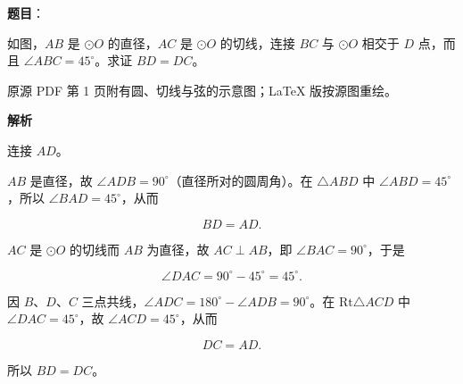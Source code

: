 \begin{answer}

\textbf{题目}：

如图，$AB$ 是 $\odot O$ 的直径，$AC$ 是 $\odot O$ 的切线，连接 $BC$ 与 $\odot O$ 相交于 $D$ 点，而且 $\angle ABC=45^\circ$。求证 $BD=DC$。

\begin{gktip}
原源 PDF 第 1 页附有圆、切线与弦的示意图；LaTeX 版按源图重绘。
\end{gktip}
\nopagebreak[4]
\begin{center}\end{center}
\nopagebreak[4]
\textbf{解析}

连接 $AD$。

$AB$ 是直径，故 $\angle ADB=90^\circ$（直径所对的圆周角）。在 $\triangle ABD$ 中 $\angle ABD=45^\circ$，所以 $\angle BAD=45^\circ$，从而

\nopagebreak[4]
\[
BD=AD.
\]

$AC$ 是 $\odot O$ 的切线而 $AB$ 为直径，故 $AC\perp AB$，即 $\angle BAC=90^\circ$，于是

\nopagebreak[4]
\[
\angle DAC=90^\circ-45^\circ=45^\circ.
\]

因 $B\text{、}D\text{、}C$ 三点共线，$\angle ADC=180^\circ-\angle ADB=90^\circ$。在 $\mathrm{Rt}\triangle ACD$ 中 $\angle DAC=45^\circ$，故 $\angle ACD=45^\circ$，从而

\nopagebreak[4]
\[
DC=AD.
\]

所以 $BD=DC$。
\nopagebreak[4]
\begin{center}\end{center}
\nopagebreak[4]

\end{answer}
